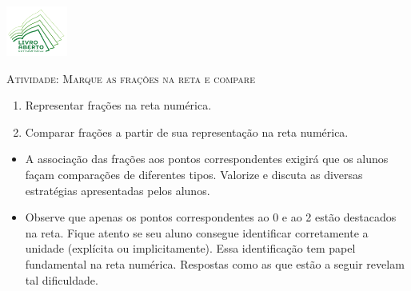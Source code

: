 \documentclass[10 pt,usenames,dvipsnames, oneside]{article}
\begin{document}
\begin{center}
  \begin{minipage}[l]{3cm}
\includegraphics[width=2cm]{../../../Figuras/logo}       
\end{minipage}\hfill
\begin{minipage}[r]{.8\textwidth}
 {\Large \scshape Atividade: Marque as frações na reta e compare}  
\end{minipage}
\end{center}
\vspace{.2cm}

\ifdefined\prof
\begin{goals}
\begin{enumerate}
\item       Representar frações na reta numérica.
\item       Comparar frações a partir de sua representação na reta numérica.
\end{enumerate}

\tcblower

\begin{itemize}
    \item       A associação das frações aos pontos correspondentes exigirá que os alunos façam comparações de diferentes tipos. Valorize e discuta as diversas estratégias apresentadas pelos alunos.
    \item Observe que apenas os pontos correspondentes ao 0 e ao 2 estão destacados na reta. Fique atento se seu aluno consegue identificar corretamente a unidade (explícita ou implicitamente). Essa identificação tem papel fundamental na reta numérica. Respostas como as que estão a seguir revelam tal dificuldade.
      \begin{center}
\end{center}
\end{itemize}
\end{goals}
\end{document}
